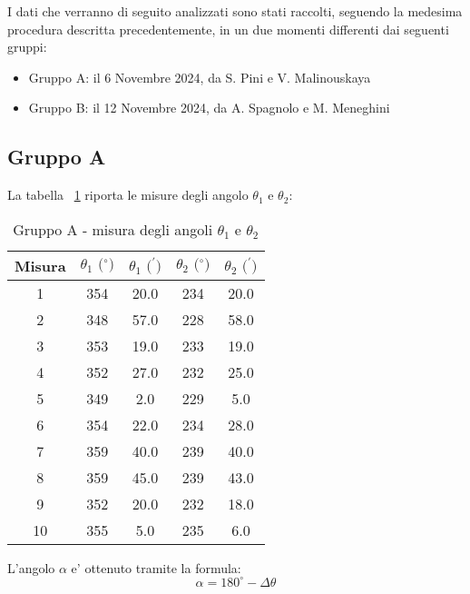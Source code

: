 I dati che verranno di seguito analizzati sono stati raccolti, seguendo la medesima procedura descritta precedentemente, in un due momenti differenti dai seguenti gruppi:
\begin{itemize}
	\item Gruppo A: il 6 Novembre 2024, da S. Pini e V. Malinouskaya
	\item Gruppo B: il 12 Novembre 2024, da A. Spagnolo e M. Meneghini
\end{itemize}

\subsection{Gruppo A}
La tabella ~\ref{table:tbl1} riporta le misure degli angolo $\theta_1$ e $\theta_2$:
\begin{table}[!htbp]
    {\par\centering
    \begin{tabular}{ccccc}
        \hline
        Misura & $\theta_1 \text{ ($^{\circ}$)}$ & $\theta_1 \text{ ($^{\prime}$)}$ & $\theta_2 \text{ ($^{\circ}$)}$ & $\theta_2 \text{ ($^{\prime}$)}$ \\
        \hline
        1   &	354	&	20.0	&	234	&	20.0\\
        2	&	348	&	57.0	&	228	&	58.0\\
        3	&	353	&	19.0	&	233	&	19.0\\
        4	&	352	&	27.0	&	232	&	25.0\\
        5	&	349	&	2.0	&	229	&	5.0\\
        6	&	354	&	22.0	&	234	&	28.0\\
        7	&	359	&	40.0	&	239	&	40.0\\
        8	&	359	&	45.0	&	239	&	43.0\\
        9	&	352	&	20.0	&	232	&	18.0\\
        10	&	355	&	5.0	&	235	&	6.0\\
        \hline
    \end{tabular}
    \par}
    \caption{Gruppo A - misura degli angoli $\theta_1$ e $\theta_2$} \label{table:tbl1}
\end{table}


L'angolo $\alpha$ e' ottenuto tramite la formula:
\[
	\alpha = 180^{\circ} - \Delta \theta
\]

